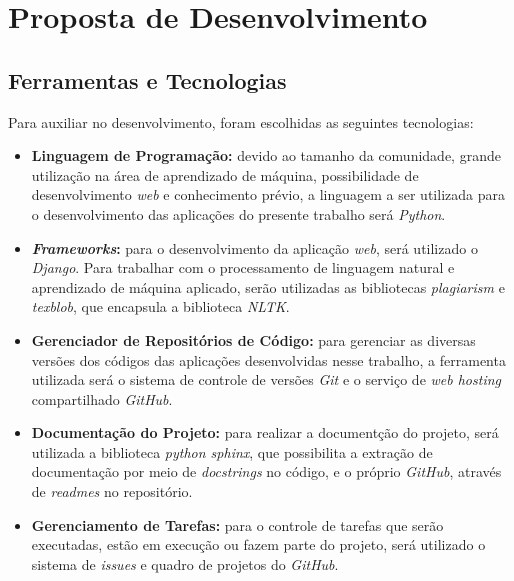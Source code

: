 \section{Proposta de Desenvolvimento}

\subsection{Ferramentas e Tecnologias}
\label{ferramentas}

Para auxiliar no desenvolvimento, foram escolhidas as seguintes tecnologias:

\begin{itemize}
    \item \textbf{Linguagem de Programação:} devido ao tamanho da comunidade, grande utilização na área de aprendizado de máquina, possibilidade de desenvolvimento \textit{web} e conhecimento prévio, a linguagem a ser utilizada para o desenvolvimento das aplicações do presente trabalho será \textit{Python}.
    \item \textbf{\textit{Frameworks}:} para o desenvolvimento da aplicação \textit{web}, será utilizado o \textit{Django}. Para trabalhar com o processamento de linguagem natural e aprendizado de máquina aplicado, serão utilizadas as bibliotecas \textit{plagiarism} e \textit{texblob}, que encapsula a biblioteca \textit{NLTK}.
    \item \textbf{Gerenciador de Repositórios de Código:} para gerenciar as diversas versões dos códigos das aplicações desenvolvidas nesse trabalho, a ferramenta utilizada será o sistema de controle de versões \textit{Git} e o serviço de \textit{web hosting} compartilhado \textit{GitHub}.
    \item \textbf{Documentação do Projeto:} para realizar a documentção do projeto, será utilizada a biblioteca \textit{python sphinx}, que possibilita a extração de documentação por meio de \textit{docstrings} no código, e o próprio \textit{GitHub}, através de \textit{readmes} no repositório.
    \item \textbf{Gerenciamento de Tarefas:} para o controle de tarefas que serão executadas, estão em execução ou fazem parte do projeto, será utilizado o sistema de \textit{issues} e quadro de projetos do \textit{GitHub}.
\end{itemize}




